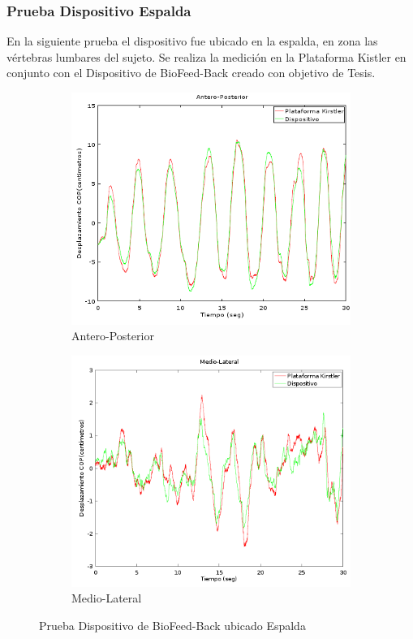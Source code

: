 \documentclass[12pt,a4paper]{article}
\newcommand{\nombreDispositivo}{Dispositivo de BioFeed-Back }
\begin{document}
\subsubsection{Prueba Dispositivo Espalda} En la siguiente prueba el dispositivo fue ubicado en la espalda, en zona las vértebras lumbares del sujeto. Se realiza la medición en la Plataforma Kistler en conjunto con el \nombreDispositivo creado con objetivo de Tesis.
		
	
	\begin{figure}[H]
		\centering
		\begin{subfigure}{.5\textwidth}
			\centering
			\includegraphics[width=1\linewidth]{images/pruebas/Espalda/Antero-Posterior}
			\caption{Antero-Posterior}
			\label{fig:anteroPosteriorEspalda}
		\end{subfigure}%
		\begin{subfigure}{.5\textwidth}
			\centering
			\includegraphics[width=1\linewidth]{images/pruebas/Espalda/Medio-Lateral}
			\caption{Medio-Lateral}
			\label{fig:medioLateralEspalda}
		\end{subfigure}
		\caption{Prueba \nombreDispositivo ubicado Espalda}
		\label{fig:pruebaEspalda}
	\end{figure}
	
\end{document}
